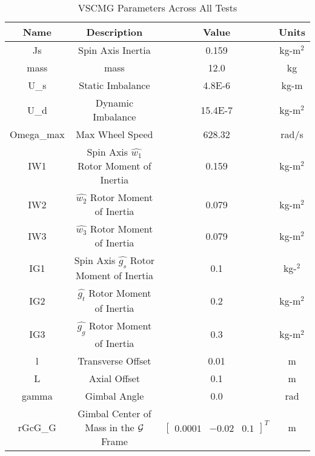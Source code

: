 \begin{table}[htbp]
	\caption{VSCMG Parameters Across All Tests}
	\label{tab:rw1}
	\centering \fontsize{10}{10}\selectfont
	\begin{tabular}{ c | c | c | c } %
		\hline
		\textbf{Name}  & \textbf{Description}  & \textbf{Value} & \textbf{Units} \\
		\hline
		Js  & Spin Axis Inertia & 0.159 & kg-m$^2$ \\
		mass & mass & 12.0 & kg \\
		U\_s & Static Imbalance & 4.8E-6 & kg-m \\
		U\_d & Dynamic Imbalance & 15.4E-7 & kg-m$^2$ \\
		Omega\_max & Max Wheel Speed & 628.32 & rad/s \\
		IW1 & Spin Axis $\hat{w_1}$ Rotor Moment of Inertia & 0.159  & kg-m$^2$ \\
		IW2 &  $\hat{w_2}$ Rotor Moment of Inertia & 0.079 & kg-m$^2$ \\
		IW3 & $\hat{w_3}$ Rotor Moment of Inertia & 0.079 & kg-m$^2$ \\
		IG1 & Spin Axis $\hat{g_s}$ Rotor Moment of Inertia & 0.1 & kg-$^2$ \\
		IG2 & $\hat{g_t}$ Rotor Moment of Inertia & 0.2 & kg-m$^2$ \\
		IG3 & $\hat{g_g}$ Rotor Moment of Inertia & 0.3 & kg-m$^2$ \\
		l  & Transverse Offset & 0.01 & m \\
		L & Axial Offset & 0.1 & m \\
		gamma & Gimbal Angle & 0.0  & rad \\
		rGcG\_G & Gimbal Center of Mass in the $\cal{G}$ Frame & $\begin{bmatrix}
		0.0001 & -0.02 & 0.1 \end{bmatrix}^T$ & m \\
		
	\end{tabular}
\end{table}

